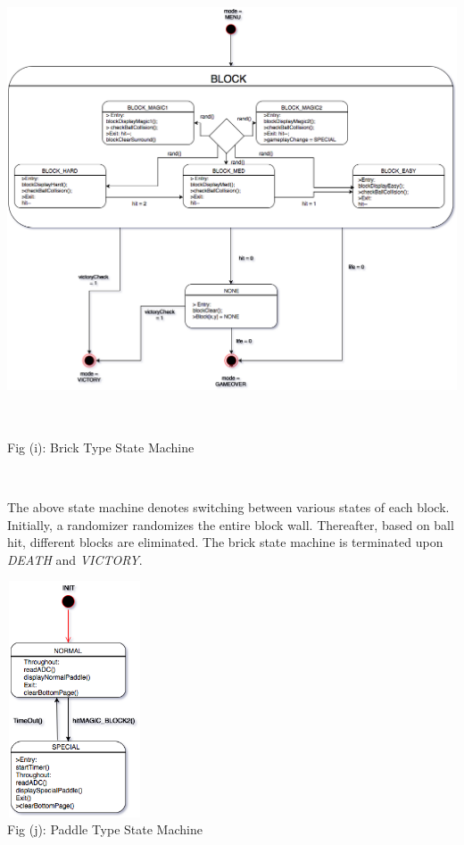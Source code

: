 \documentclass{article}
\begin{document}
\begin{center}
\includegraphics[width=14cm, height=14cm]{Images/brickTypeStatemachine} \\
\caption{Fig (i): Brick Type State Machine} \\
\end{center}
\qquad The above state machine denotes switching between various states of each block. Initially, a randomizer randomizes the entire block wall. Thereafter, based on ball hit, different blocks are eliminated. The brick state machine is terminated upon \textit{DEATH} and \textit{VICTORY}.
\begin{center}
\includegraphics[width=4cm, height=7cm]{Images/paddleTypeStateMachine} \\
\caption{Fig (j): Paddle Type State Machine} \\
\end{center}
\end{document}
